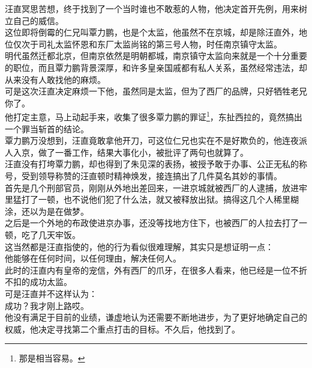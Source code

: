 \begin{multicols}{\theparacolNo}
汪直冥思苦想，终于找到了一个当时谁也不敢惹的人物，他决定首开先例，用来树立自己的威信。\\

这位即将倒霉的仁兄叫覃力鹏，也是个太监，他虽然不在京城，却是除汪直外，地位仅次于司礼太监怀恩和东厂太监尚铭的第三号人物，时任南京镇守太监。\\

明代虽然迁都北京，但南京依然是明朝都城，南京镇守太监向来就是一个十分重要的职位，而且覃力鹏背景深厚，和许多皇亲国戚都有私人关系，虽然经常违法，却从来没有人敢找他的麻烦。\\

可是这次汪直决定麻烦一下他，虽然同是太监，但为了西厂的品牌，只好牺牲老兄你了。\\

他打定主意，马上动起手来，收集了很多覃力鹏的罪证\footnote{那是相当容易。}，东扯西拉的，竟然搞出一个罪当斩首的结论。\\

覃力鹏万没想到，汪直竟敢拿他开刀，可这位仁兄也实在不是好欺负的，他连夜派人入京，做了一番工作，结果大事化小，被批评了两句也就算了。\\

汪直没有打垮覃力鹏，却也得到了朱见深的表扬，被授予敢于办事、公正无私的称号，受到领导称赞的汪直顿时精神焕发，接连搞出了几件莫名其妙的事情。\\

首先是几个刑部官员，刚刚从外地出差回来，一进京城就被西厂的人逮捕，放进牢里猛打了一顿，也不说他们犯了什么法，就又被释放出狱。搞得这几个人稀里糊涂，还以为是在做梦。\\

之后是一个外地的布政使进京办事，还没等找地方住下，也被西厂的人拉去打了一顿，吃了几天牢饭。\\

这当然都是汪直指使的，他的行为看似很难理解，其实只是想证明一点：\\

他能够在任何时间，以任何理由，解决任何人。\\

此时的汪直内有皇帝的宠信，外有西厂的爪牙，在很多人看来，他已经是一位不折不扣的成功太监。\\

可是汪直并不这样认为：\\

成功？我才刚上路哎。\\

他没有满足于目前的业绩，谦虚地认为还需要不断地进步，为了更好地确定自己的权威，他决定寻找第二个重点打击的目标。不久后，他找到了。\\


\end{multicols}
